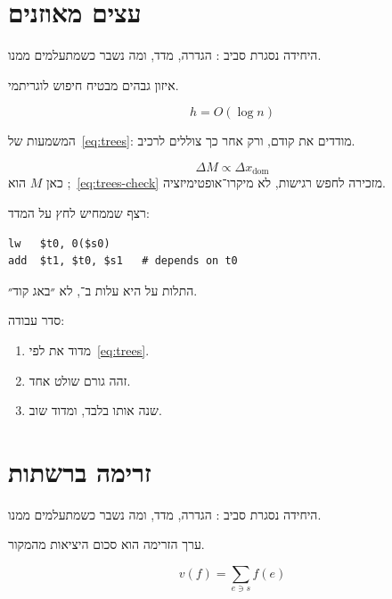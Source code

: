 \chapter{עצים מאוזנים}
\label{ch:trees}

היחידה נסגרת סביב : הגדרה, מדד, ומה נשבר כשמתעלמים ממנו.

\begin{thmbox}[frametitle={משפט — עצים מאוזנים}]
איזון גבהים מבטיח חיפוש לוגריתמי.
\end{thmbox}

\begin{equation}
\label{eq:trees}
h = O(\log n)
\end{equation}

המשמעות של~\eqref{eq:trees}: מודדים את  קודם, ורק אחר כך צוללים לרכיב.

\begin{equation}
\label{eq:trees-check}
\Delta M \propto \Delta x_{\mathrm{dom}}
\end{equation}
כאן $M$ הוא ;~\eqref{eq:trees-check} מזכירה לחפש רגישות, לא מיקרו־אופטימיזציה.

רצף שממחיש לחץ על המדד:
\begin{asmblock}
\begin{lstlisting}[style=asm]
lw   $t0, 0($s0)
add  $t1, $t0, $s1   # depends on t0
\end{lstlisting}
\end{asmblock}
התלות על  היא עלות ב־, לא ״באג קוד״.

סדר עבודה:
\begin{enumerate}
\item[(\textbf{א})] מדוד את  לפי~\eqref{eq:trees}.
\item[(\textbf{ב})] זהה גורם שולט אחד.
\item[(\textbf{ג})] שנה אותו בלבד, ומדוד שוב.
\end{enumerate}

\chapter{זרימה ברשתות}
\label{ch:flow}

היחידה נסגרת סביב : הגדרה, מדד, ומה נשבר כשמתעלמים ממנו.

\begin{defbox}[frametitle={הגדרה — זרימה ברשתות}]
ערך הזרימה הוא סכום היציאות מהמקור.
\end{defbox}

\begin{equation}
\label{eq:flow}
v(f)=\sum_{e \ni s} f(e)
\end{equation}

